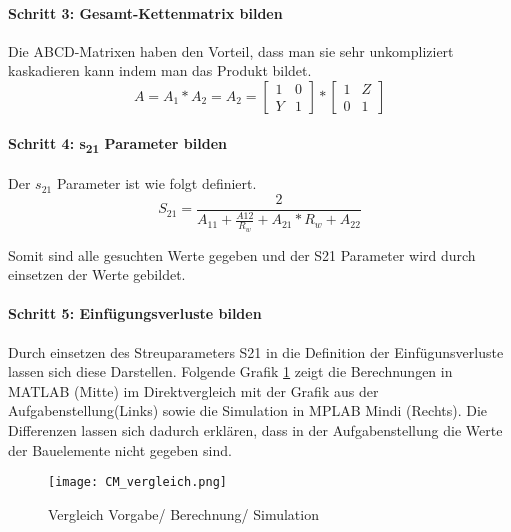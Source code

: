 \paragraph{Schritt 3: Gesamt-Kettenmatrix bilden}\label{paragraph:schritt3}
Die ABCD-Matrixen haben den Vorteil, dass man sie sehr unkompliziert kaskadieren kann indem man das Produkt bildet.
\begin{equation}
A = A_1*A_2 = A_2 = \left[\begin{matrix}
1 & 0\\ Y&1 
\end{matrix}\right] * 
\left[\begin{matrix}
1 & Z\\ 0&1 
\end{matrix} \right]
\end{equation}

\paragraph{Schritt 4: s\textsubscript{21} Parameter bilden}\label{paragraph:schritt4}
Der $s_{21}$ Parameter ist wie folgt definiert.
\begin{equation}\label{equ:def_s21_aparams}
S_{21} = \frac{2}{A_{11}+\frac{A{12}}{R_w}+A_{21}*R_w+A_{22}}
\end{equation}

Somit sind alle gesuchten Werte gegeben und der S21 Parameter wird durch einsetzen der Werte gebildet.

\paragraph{Schritt 5: Einfügungsverluste bilden}\label{paragraph:schritt5}
Durch einsetzen des Streuparameters S21 in die Definition der Einfügunsverluste lassen sich diese Darstellen. Folgende Grafik \ref{fig:Vergleich Berechnung Simulation} zeigt die Berechnungen in MATLAB (Mitte) im Direktvergleich mit der Grafik aus der Aufgabenstellung(Links) sowie die Simulation in MPLAB Mindi (Rechts). Die Differenzen lassen sich dadurch erklären, dass in der Aufgabenstellung die Werte der Bauelemente nicht gegeben sind.
\begin{figure}[H]
	\centering
	\texttt{[image: CM\_vergleich.png]}
	\caption{Vergleich Vorgabe/ Berechnung/ Simulation}
	\label{fig:Vergleich Berechnung Simulation}
\end{figure}
